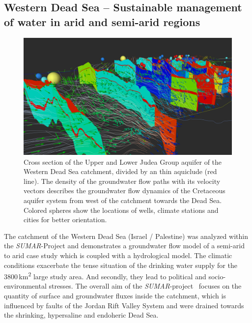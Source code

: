 \documentclass[twocolumn]{svjour3}          %
\begin{document}
\subsection{Western Dead Sea -- Sustainable management of water in arid and semi-arid regions}
\label{western-dead-sea---sustainable-management-of-water-in-arid-and-semi-arid-regions}

\begin{figure}[htb]
  \includegraphics[width=\linewidth]{images/deadsea.jpg}
\caption{Cross section of the Upper and Lower Judea Group aquifer of the Western Dead Sea catchment, divided by an thin aquiclude (red line). The density of the groundwater flow paths with its velocity vectors describes the groundwater flow dynamics of the Cretaceous aquifer system from west of the catchment towards the Dead Sea. Colored spheres show the locations of wells, climate stations and cities for better orientation.}
\label{fig:deadsea}
\end{figure}

The catchment of the Western Dead Sea (Israel / Palestine) was analyzed within the \emph{SUMAR}-Project and de\-mon\-strates a groundwater flow model of a semi-arid to arid case study which is coupled with a hydrological model. The climatic conditions exacerbate the tense situation of the drinking water supply for the 3800\,km\textsuperscript{2} large study area. And secondly, they lead to political and socio-environmental stresses. The overall aim of the \emph{SU\-MAR}-project~\cite{Siebert:2014} focuses on the quantity of surface and groundwater fluxes inside the catchment, which is influenced by faults of the Jordan Rift Valley System and were drained towards the shrinking, hypersaline and endoheric Dead Sea.
\end{document}
